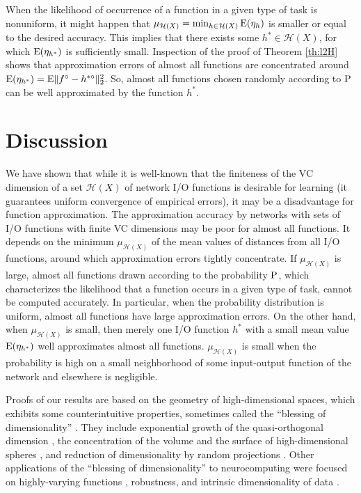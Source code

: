 \documentclass{elsarticle}
\def\P{{\rm P}}
\def\E{{\rm E}}
\def\cH{{\mathcal H}}
\begin{document}
When the likelihood of occurrence of a function in a given type of task is nonuniform, it might happen that
$\mu_{\cH(X)} = \min_{h \in \cH(X)} \E(\eta_h)$ is smaller or equal to the  desired accuracy. This implies that there exists some $h^* \in \cH(X)$, for which $\E(\eta_{h^*})$ is sufficiently small. Inspection of the proof of Theorem \ref{th:l2H} shows that approximation errors of almost all
functions are concentrated around $\E(\eta_{h^*}) = \E \| f^{\circ} - h^{*\circ}\|_2^2$. So, almost all functions chosen randomly according to $\P$ can be well approximated by the function $h^*$.


\section{Discussion}
\label{sec:disc}

We have shown that while it is well-known that the finiteness of the VC dimension of a set $\cH(X)$ of network I/O functions is desirable for learning (it guarantees uniform convergence of empirical errors), it may be a disadvantage for function approximation. The approximation accuracy by networks with sets of I/O functions with finite VC dimensions may be poor for almost all functions. It depends on the minimum $\mu_{\cH(X)}$ of the mean values of distances from all I/O functions, around which approximation errors tightly concentrate. If $\mu_{\cH(X)}$ is large, almost all functions drawn according to the probability $\P$, which characterizes the likelihood that a function occurs in a given type of task, cannot be computed accurately. In particular, when the probability distribution is uniform, almost all functions have large approximation errors. On the other hand, when $\mu_{\cH(X)}$ is small, then merely one I/O function $h^*$ with a small mean value $\E(\eta_{h^*})$ well approximates almost all functions. $\mu_{\cH(X)}$ is small when the probability is high on a small neighborhood of some input-output function of the network and elsewhere is negligible.

Proofs of our results are based on the geometry of high-dimensional spaces, which exhibits some counterintuitive properties, sometimes called the ``blessing of dimensionality'' \cite{do00,goty18,goal19,vk19}. They include exponential growth of the quasi-orthogonal dimension \cite{kavk93}, the concentration of the volume and the surface of high-dimensional spheres \cite{ba97}, and reduction of dimensionality by random projections \cite{joli84}. Other applications of the ``blessing of dimensionality'' to neurocomputing were focused on highly-varying functions \cite{vksa16}, robustness, and intrinsic dimensionality of data \cite{sual23,baal23}.
\end{document}
